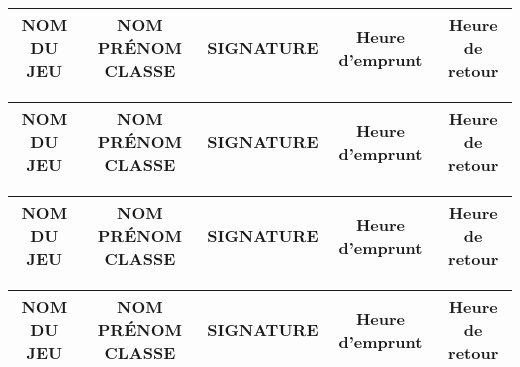 \documentclass[8pt,a4paper]{article}
\begin{document}
\begin{table}[ht]
   		\begin{tabular}{|c|c|c|c|c|}
			\hline	
			NOM DU JEU &NOM PR\'ENOM CLASSE &SIGNATURE & Heure d'emprunt & Heure de retour \\
			\hline
   		\end{tabular}

   		\begin{tabular}{|c|c|c|c|c|}
			\hline	
			NOM DU JEU &NOM PR\'ENOM CLASSE &SIGNATURE & Heure d'emprunt & Heure de retour \\
			\hline
   		\end{tabular}

   		\begin{tabular}{|c|c|c|c|c|}
			\hline	
			NOM DU JEU &NOM PR\'ENOM CLASSE &SIGNATURE & Heure d'emprunt & Heure de retour \\
			\hline
   		\end{tabular}

   		\begin{tabular}{|c|c|c|c|c|}
			\hline	
			NOM DU JEU &NOM PR\'ENOM CLASSE &SIGNATURE & Heure d'emprunt & Heure de retour \\
			\hline
   		\end{tabular}
	\end{table}
\end{document}
